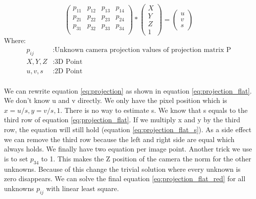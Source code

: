 \documentclass[11pt,a4paper,titlepage,oneside]{report}
\begin{document}
\begin{equation}\label{eq:projection}
	\begin{pmatrix}p_{11} & p_{12} & p_{13} & p_{14}\\
		p_{21} & p_{22} & p_{23} & p_{24}\\
		p_{31} & p_{32} & p_{33} & p_{34}\\
	\end{pmatrix}*
	\begin{pmatrix}
		X \\
		Y \\
		Z \\
		1
	\end{pmatrix}=
	\begin{pmatrix}
		u \\
		v \\
		s
  \end{pmatrix}
\end{equation}
Where:
\begin{align*}
	p_{ij}		&: \text{Unknown camera projection values of projection matrix P}\\
	X,Y,Z			&: \text{3D Point}\\
	u,v,s			&: \text{2D Point}\\
\end{align*}

We can rewrite equation \ref{eq:projection} as shown in equation \ref{eq:projection_flat}. We don't know u and v directly. We only have the pixel position which is $x=u/s, y=v/s, 1$. There is no way to estimate s. We know that s equals to the third row of equation \ref{eq:projection_flat}. If we multiply x and y by the third row, the equation will still hold (equation \ref{eq:projection_flat_s}). As a side effect we can remove the third row because the left and right side are equal which always holds. We finally have two equation per image point. Another trick we use is to set $p_{34}$ to 1. This makes the Z position of the camera the norm for the other unknowns. Because of this change the trivial solution where every unknown is zero disappears. We can solve the final equation \ref{eq:projection_flat_red} for all unknowns $p_{ij}$ with linear least square.
\end{document}
